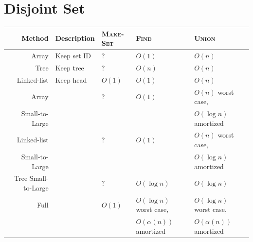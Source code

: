 \documentclass[12pt,a4paper,twoside]{article}
\theoremstyle{definition}
\theoremstyle{remark}
\begin{document}
    
    \section{Disjoint Set}
    \begin{tabular}{r|llll}\hline
        Method & Description & \textsc{Make-Set} & \textsc{Find} & \textsc{Union} \\\hline
        Array & Keep set ID             & ? & $O(1)$ & $O(n)$ \\ \hline
        Tree & Keep tree                & ? & $O(n)$ & $O(n)$ \\ \hline
        Linked-list & Keep head         & $O(1)$ & $O(1)$ & $O(n)$ \\ \hline
        Array &                         & ? & $O(1)$ & $O(n)$ worst case,  \\
        Small-to-Large &                &   &   &   $O(\log n)$ amortized \\ \hline
        Linked-list &                   & ? & $O(1)$ & $O(n)$ worst case, \\
        Small-to-Large &                &   &   & $O(\log n)$ amortized \\ \hline
        Tree Small-to-Large &           & ? & $O(\log n)$ & $O(\log n)$ \\ \hline
        Full &                          & $O(1)$ & $O(\log n)$ worst case, & $O(\log n)$ worst case,  \\
        &                               &   & $O(\alpha(n))$ amortized & $O(\alpha(n))$ amortized \\\hline
    \end{tabular}
    \clearpage
\end{document}
